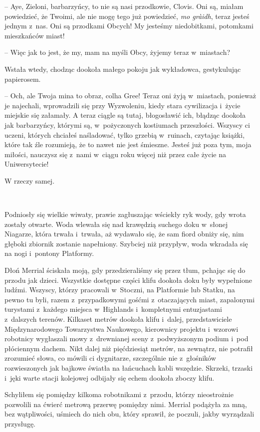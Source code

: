 \documentclass[oneside,polish,11pt,sfheadings]{mwbk}
\begin{document}
-- Aye, Zieloni, barbarzyńcy, to nie są nasi przodkowie, Clovis. Oni są,
miałam powiedzieć, że Twoimi, ale nie mogę tego już powiedzieć, \textit{mo
gràidh}, teraz jesteś jednym z~nas. Oni są przodkami Obcych! My jesteśmy
niedobitkami, potomkami mieszkańców miast!

-- Więc jak to jest, że my, mam na myśli Obcy, żyjemy teraz w~miastach?

Wstała wtedy, chodząc dookoła małego pokoju jak wykładowca, gestykulując
papierosem. 

-- Och, ale Twoja mina to obraz, colha Gree! Teraz oni żyją w~miastach, ponieważ je najechali, wprowadzili się przy Wyzwoleniu, kiedy
stara cywilizacja i~życie miejskie się załamały. A teraz ciągle są
tutaj, błogosławić ich, błądząc dookoła jak barbarzyńcy, którymi są, w~pożyczonych kostiumach przeszłości. Wszyscy ci uczeni, których chciałeś
naśladować, tylko grzebią w~ruinach, czytając książki, które tak źle
rozumieją, że to nawet nie jest śmieszne. Jesteś już poza tym, moja
miłości, nauczysz się z~nami w~ciągu roku więcej niż przez całe życie na
Uniwersytecie!

W rzeczy samej.

~

Podniosły się wielkie wiwaty, prawie zagłuszając wściekły ryk wody, gdy
wrota zostały otwarte. Woda wlewała się nad krawędzią suchego doku w~słonej Niagarze, która trwała i~trwała, aż wydawało się, że sam fiord
obniży się, nim głęboki zbiornik zostanie napełniony. Szybciej niż
przypływ, woda wkradała się na nogi i~pontony Platformy.

Dłoń Merrial ściskała moją, gdy przedzieraliśmy się przez tłum, pchając
się do przodu jak dzieci. Wszystkie dostępne części klifu dookoła doku
były wypełnione ludźmi. Wszyscy, którzy pracowali w~Stoczni, na
Platformie lub Statku, na pewno tu byli, razem z~przypadkowymi gośćmi z~otaczających miast, zapalonymi turystami z~każdego miejsca w~Highlands i~kompletnymi entuzjastami z~dalszych terenów. Kilkaset metrów dookoła
klifu i~dalej, przedstawiciele Międzynarodowego Towarzystwa Naukowego,
kierownicy projektu i~wzorowi robotnicy wygłaszali mowy z~drewnianej
sceny z~podwyższonym podium i~pod płóciennym dachem. Nikt dalej niż
pięćdziesiąt metrów, na zewnątrz, nie potrafił zrozumieć słowa, co
mówili ci dygnitarze, szczególnie nie z~głośników rozwieszonych jak
bajkowe światła na łańcuchach kabli wszędzie. Skrzeki, trzaski i~jęki
warte stacji kolejowej odbijały się echem dookoła zboczy klifu.

Schyliłem się pomiędzy kilkoma robotnikami z~przodu, którzy nieostrożnie
pozwolili na ćwierć metrową przerwę pomiędzy nimi. Merrial podążyła za
mną, bez wątpliwości, uśmiech do nich obu, który sprawił, że poczuli,
jakby wyrządzali przysługę.
\end{document}
